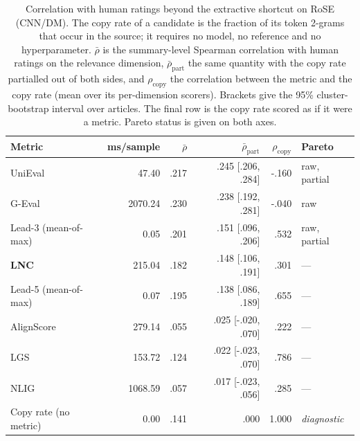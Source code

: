 \begin{table}[t]
\centering
\caption{Correlation with human ratings beyond the extractive shortcut on RoSE (CNN/DM). The copy rate of a candidate is the fraction of its token 2-grams that occur in the source; it requires no model, no reference and no hyperparameter. $\bar{\rho}$ is the summary-level Spearman correlation with human ratings on the relevance dimension, $\bar{\rho}_{\mathrm{part}}$ the same quantity with the copy rate partialled out of both sides, and $\rho_{\mathrm{copy}}$ the correlation between the metric and the copy rate (mean over its per-dimension scorers). Brackets give the 95\% cluster-bootstrap interval over articles. The final row is the copy rate scored as if it were a metric. Pareto status is given on both axes.}
\label{tab:transfer_rose_cnndm_confound}
\small
\linespread{1}\selectfont
\setlength{\tabcolsep}{4pt}
\begin{tabular}{@{}lrrrrl@{}}
\toprule
Metric & ms/sample & $\bar{\rho}$ & $\bar{\rho}_{\mathrm{part}}$ & $\rho_{\mathrm{copy}}$ & Pareto \\
\midrule
UniEval & 47.40 & .217 & .245 {\scriptsize [.206, .284]} & -.160 & raw, partial \\
G-Eval & 2070.24 & .230 & .238 {\scriptsize [.192, .281]} & -.040 & raw \\
Lead-3 (mean-of-max) & 0.05 & .201 & .151 {\scriptsize [.096, .206]} & .532 & raw, partial \\
\textbf{LNC} & 215.04 & .182 & .148 {\scriptsize [.106, .191]} & .301 & --- \\
Lead-5 (mean-of-max) & 0.07 & .195 & .138 {\scriptsize [.086, .189]} & .655 & --- \\
AlignScore & 279.14 & .055 & .025 {\scriptsize [-.020, .070]} & .222 & --- \\
LGS & 153.72 & .124 & .022 {\scriptsize [-.023, .070]} & .786 & --- \\
NLIG & 1068.59 & .057 & .017 {\scriptsize [-.023, .056]} & .285 & --- \\
\midrule
Copy rate (no metric) & 0.00 & .141 & .000 & 1.000 & \emph{diagnostic} \\
\bottomrule
\end{tabular}
\end{table}

